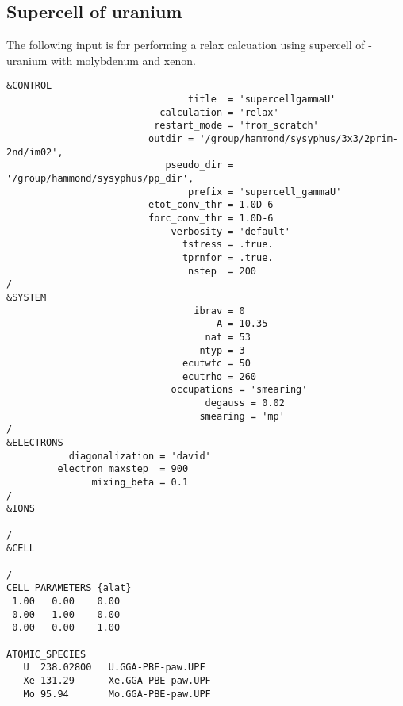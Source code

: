 \subsection{Supercell of uranium}
The following input is for performing a relax calcuation using supercell of \textgamma-uranium with molybdenum and xenon.
\lstset{style=atpw}
\begin{lstlisting}
&CONTROL
                                title  = 'supercellgammaU'
                           calculation = 'relax'
                          restart_mode = 'from_scratch'
                         outdir = '/group/hammond/sysyphus/3x3/2prim-2nd/im02',
                            pseudo_dir = '/group/hammond/sysyphus/pp_dir',
                                prefix = 'supercell_gammaU'
                         etot_conv_thr = 1.0D-6
                         forc_conv_thr = 1.0D-6
                             verbosity = 'default'
                               tstress = .true.
                               tprnfor = .true.
                                nstep  = 200
/
&SYSTEM
                                 ibrav = 0
                                     A = 10.35
                                   nat = 53
                                  ntyp = 3
                               ecutwfc = 50
                               ecutrho = 260
                             occupations = 'smearing'
                                   degauss = 0.02
                                  smearing = 'mp'
/
&ELECTRONS
           diagonalization = 'david'
         electron_maxstep  = 900
               mixing_beta = 0.1
/
&IONS

/
&CELL

/
CELL_PARAMETERS {alat}
 1.00   0.00    0.00
 0.00   1.00    0.00
 0.00   0.00    1.00

ATOMIC_SPECIES
   U  238.02800   U.GGA-PBE-paw.UPF
   Xe 131.29      Xe.GGA-PBE-paw.UPF
   Mo 95.94       Mo.GGA-PBE-paw.UPF


\end{lstlisting}
